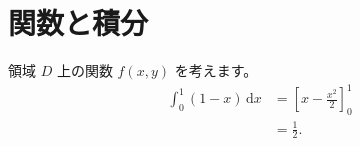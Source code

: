\documentclass[a5paper,10pt]{ltjsarticle}
\begin{document}
\section{関数と積分}
領域 $D$ 上の関数 $f(x,y)$ を考えます。
\begin{align}
\int_0^1 (1-x)\,\mathrm{d}x
  &= \left[x-\frac{x^2}{2}\right]_0^1 \\
  &= \frac{1}{2}.
\end{align}
\end{document}
